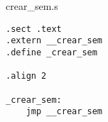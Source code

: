 crear\_sem.s

\begin{verbatim}
.sect .text
.extern __crear_sem
.define _crear_sem

.align 2

_crear_sem:
	jmp __crear_sem
\end{verbatim}
